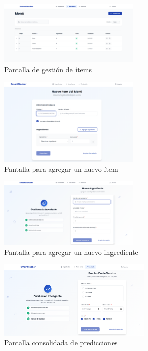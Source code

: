 \begin{figure}[htbp]
    \centering
    \includegraphics[width=0.6\textwidth]{images/items.png}
    \caption{Pantalla de gestión de ítems}
    \label{fig:ux-items}
\end{figure}

\begin{figure}[htbp]
    \centering
    \includegraphics[width=0.6\textwidth]{images/nuevoItem.png}
    \caption{Pantalla para agregar un nuevo ítem}
    \label{fig:ux-nuevo-item}
\end{figure}

\begin{figure}[htbp]
    \centering
    \includegraphics[width=0.6\textwidth]{images/nuevoIngrediente.png}
    \caption{Pantalla para agregar un nuevo ingrediente}
    \label{fig:ux-nuevo-ingrediente}
\end{figure}

\begin{figure}[htbp]
    \centering
    \includegraphics[width=0.65\textwidth]{images/predicciones.png}
    \caption{Pantalla consolidada de predicciones}
    \label{fig:ux-predicciones}
\end{figure}

